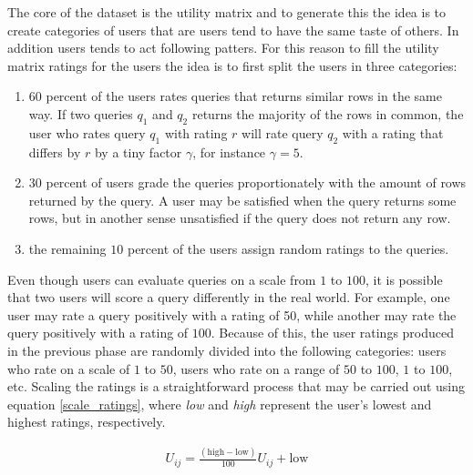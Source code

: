 The core of the dataset is the utility matrix and to generate this the idea is to create categories of users that are users tend to have the same taste of others. In addition users tends to act following patters. For this reason to fill the utility matrix ratings for the users the idea is to first split the users in three categories:
\begin{enumerate}
    \item $60$ percent of the users rates queries that returns similar rows in the same way. If two queries $q_1$ and $q_2$ returns the majority of the rows in common, the user who rates query $q_1$ with rating $r$ will rate query $q_2$ with a rating that differs by $r$ by a tiny factor $\gamma$, for instance $\gamma = 5$. 
    \item $30$ percent of users grade the queries proportionately with the amount of rows returned by the query. A user may be satisfied when the query returns some rows, but in another sense unsatisfied if the query does not return any row.
    \item the remaining $10$ percent of the users assign random ratings to the queries.
\end{enumerate}

Even though users can evaluate queries on a scale from $1$ to $100$, it is possible that two users will score a query differently in the real world. For example, one user may rate a query positively with a rating of 50, while another may rate the query positively with a rating of $100$. Because of this, the user ratings produced in the previous phase are randomly divided into the following categories: users who rate on a scale of $1$ to $50$, users who rate on a range of $50$ to $100$, $1$ to $100$, etc. Scaling the ratings is a straightforward process that may be carried out using equation \ref{scale_ratings}, where \emph{low} and \emph{high} represent the user's lowest and highest ratings, respectively.  


\begin{equation}
\begin{aligned}
    U_{ij} =  \frac{(\text{high} - \text{low})}{100}  U_{ij} + \text{low}
\end{aligned}
\label{scale_ratings}
\end{equation}




